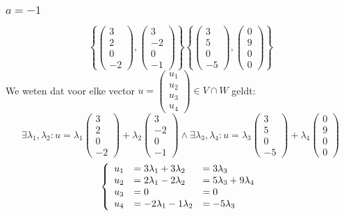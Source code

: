 \documentclass[lineaire_algebra_oplossingen.tex]{subfiles}
\begin{document}
\subsubsection*{$a=-1$}
\[
\left\lbrace
\begin{pmatrix}
3\\2\\0\\-2
\end{pmatrix}
,
\begin{pmatrix}
3\\-2\\0\\-1
\end{pmatrix}
\right\rbrace
\left\lbrace
\begin{pmatrix}
3\\5\\0\\-5
\end{pmatrix}
,
\begin{pmatrix}
0\\9\\0\\0
\end{pmatrix}
\right\rbrace
\]
We weten dat voor elke vector $u = \begin{pmatrix}
u_1\\u_2\\u_3\\u_4
\end{pmatrix} \in V\cap W$ geldt:
\[\exists \lambda_1,\lambda_2 :u = 
\lambda_1
\begin{pmatrix}
3\\2\\0\\-2
\end{pmatrix} + 
\lambda_2
\begin{pmatrix}
3\\-2\\0\\-1
\end{pmatrix}
\wedge
\exists \lambda_3,\lambda_4 :u = 
\lambda_3
\begin{pmatrix}
3\\5\\0\\-5
\end{pmatrix} + 
\lambda_4
\begin{pmatrix}
0\\9\\0\\0
\end{pmatrix}
\]
\[
\left\lbrace
\begin{array}{r l l}
u_1 &= 3\lambda_1+3\lambda_2 &= 3\lambda_3\\
u_2 &= 2\lambda_1-2\lambda_2 &= 5\lambda_3+9\lambda_4\\
u_3 &= 0 &= 0\\
u_4 &= -2\lambda_1 -1\lambda_2 &= -5\lambda_3
\end{array}
\right.
\]
\end{document}
